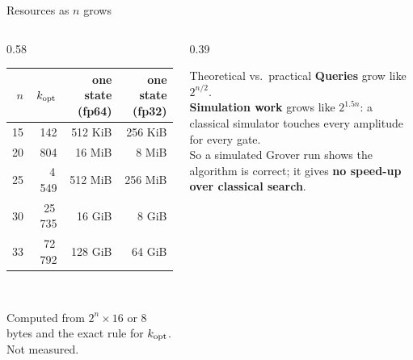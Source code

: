 \documentclass[aspectratio=169,11pt]{beamer}
\newcommand{\hl}[1]{{\color{qorange}\textbf{#1}}}
\newcommand{\key}[1]{{\color{qdark}\textbf{#1}}}
\begin{document}
\begin{frame}{Resources as $n$ grows}
  \begin{columns}[c]
    \begin{column}{0.58\textwidth}
      \centering\small
      \begin{tabular}{rrrr}
        \toprule
        $n$ & $k_{\rm opt}$ & one state (fp64) & one state (fp32)\\
        \midrule
        15 & 142 & 512 KiB & 256 KiB\\
        20 & 804 & 16 MiB & 8 MiB\\
        25 & 4\,549 & 512 MiB & 256 MiB\\
        30 & 25\,735 & 16 GiB & 8 GiB\\
        33 & 72\,792 & 128 GiB & 64 GiB\\
        \bottomrule
      \end{tabular}\\[2mm]
      \raggedright\footnotesize Computed from $2^n \times 16$ or $8$ bytes and the exact rule for $k_{\rm opt}$. Not measured.
    \end{column}
    \begin{column}{0.39\textwidth}
      \begin{block}{Theoretical vs.\ practical}
        \small
        \key{Queries} grow like $2^{n/2}$.\\[1mm]
        \key{Simulation work} grows like $2^{1.5n}$: a classical simulator touches every amplitude for every gate.\\[1mm]
        So a simulated Grover run shows the algorithm is correct; it gives \hl{no speed-up over classical search}.
      \end{block}
    \end{column}
  \end{columns}
\end{frame}
\end{document}
